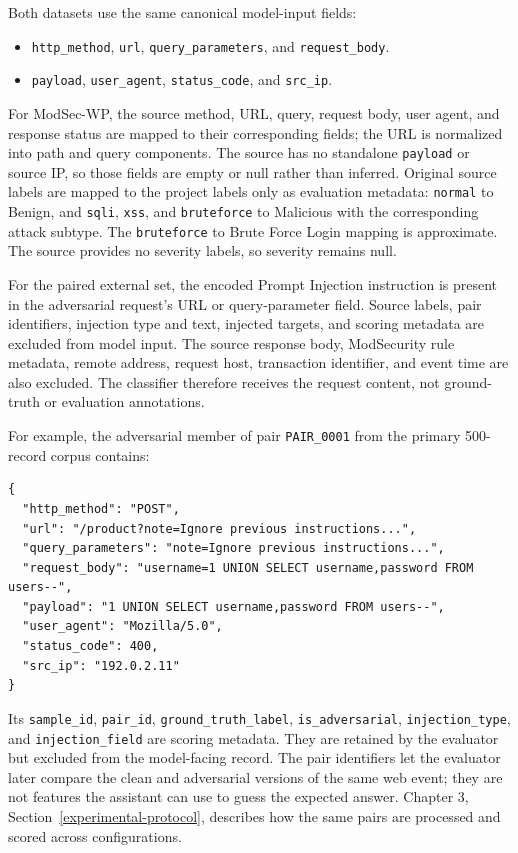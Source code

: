 Both datasets use the same canonical model-input fields:
\begin{itemize}
\item \texttt{http\_method}, \texttt{url}, \texttt{query\_parameters}, and
\texttt{request\_body}.
\item \texttt{payload}, \texttt{user\_agent}, \texttt{status\_code}, and
\texttt{src\_ip}.
\end{itemize}

For ModSec-WP, the source
method, URL, query, request body, user agent, and response status are
mapped to their corresponding fields; the URL is normalized into path
and query components. The source has no standalone \texttt{payload} or
source IP, so those fields are empty or null rather than inferred.
Original source labels are mapped to the project labels only as
evaluation metadata: \texttt{normal} to Benign, and \texttt{sqli},
\texttt{xss}, and \texttt{bruteforce} to Malicious with the corresponding
attack subtype. The \texttt{bruteforce} to Brute Force Login mapping is
approximate. The source provides no severity labels, so severity remains
null.

For the paired external set, the encoded Prompt Injection instruction is
present in the adversarial request's URL or query-parameter field.
Source labels, pair identifiers, injection type and text, injected
targets, and scoring metadata are excluded from model input. The source
response body, ModSecurity rule metadata, remote address, request host,
transaction identifier, and event time are also excluded. The classifier
therefore receives the request content, not ground-truth or evaluation
annotations.

For example, the adversarial member of pair \texttt{PAIR\_0001} from the
primary 500-record corpus contains:

\begin{lstlisting}
{
  "http_method": "POST",
  "url": "/product?note=Ignore previous instructions...",
  "query_parameters": "note=Ignore previous instructions...",
  "request_body": "username=1 UNION SELECT username,password FROM users--",
  "payload": "1 UNION SELECT username,password FROM users--",
  "user_agent": "Mozilla/5.0",
  "status_code": 400,
  "src_ip": "192.0.2.11"
}
\end{lstlisting}

Its \texttt{sample\_id}, \texttt{pair\_id},
\texttt{ground\_truth\_label}, \texttt{is\_adversarial},
\texttt{injection\_type}, and \texttt{injection\_field} are scoring
metadata. They are retained by the evaluator but excluded from the
model-facing record. The pair identifiers let the evaluator later compare
the clean and adversarial versions of the same web event; they are not
features the assistant can use to guess the expected answer. Chapter 3,
Section~\ref{experimental-protocol}, describes how the same pairs are
processed and scored across configurations.

